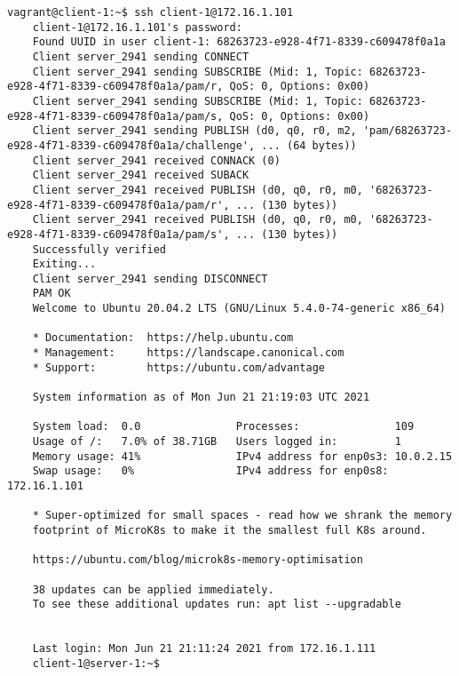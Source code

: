 \begin{lstlisting}[style=Consola, caption={Petición SSH cliente al servidor}, label={code:ssh-request}]
    vagrant@client-1:~$ ssh client-1@172.16.1.101
    client-1@172.16.1.101's password:
    Found UUID in user client-1: 68263723-e928-4f71-8339-c609478f0a1a
    Client server_2941 sending CONNECT
    Client server_2941 sending SUBSCRIBE (Mid: 1, Topic: 68263723-e928-4f71-8339-c609478f0a1a/pam/r, QoS: 0, Options: 0x00)
    Client server_2941 sending SUBSCRIBE (Mid: 1, Topic: 68263723-e928-4f71-8339-c609478f0a1a/pam/s, QoS: 0, Options: 0x00)
    Client server_2941 sending PUBLISH (d0, q0, r0, m2, 'pam/68263723-e928-4f71-8339-c609478f0a1a/challenge', ... (64 bytes))
    Client server_2941 received CONNACK (0)
    Client server_2941 received SUBACK
    Client server_2941 received PUBLISH (d0, q0, r0, m0, '68263723-e928-4f71-8339-c609478f0a1a/pam/r', ... (130 bytes))
    Client server_2941 received PUBLISH (d0, q0, r0, m0, '68263723-e928-4f71-8339-c609478f0a1a/pam/s', ... (130 bytes))
    Successfully verified
    Exiting...
    Client server_2941 sending DISCONNECT
    PAM OK
    Welcome to Ubuntu 20.04.2 LTS (GNU/Linux 5.4.0-74-generic x86_64)

    * Documentation:  https://help.ubuntu.com
    * Management:     https://landscape.canonical.com
    * Support:        https://ubuntu.com/advantage

    System information as of Mon Jun 21 21:19:03 UTC 2021

    System load:  0.0               Processes:               109
    Usage of /:   7.0% of 38.71GB   Users logged in:         1
    Memory usage: 41%               IPv4 address for enp0s3: 10.0.2.15
    Swap usage:   0%                IPv4 address for enp0s8: 172.16.1.101

    * Super-optimized for small spaces - read how we shrank the memory
    footprint of MicroK8s to make it the smallest full K8s around.

    https://ubuntu.com/blog/microk8s-memory-optimisation

    38 updates can be applied immediately.
    To see these additional updates run: apt list --upgradable


    Last login: Mon Jun 21 21:11:24 2021 from 172.16.1.111
    client-1@server-1:~$
\end{lstlisting}

